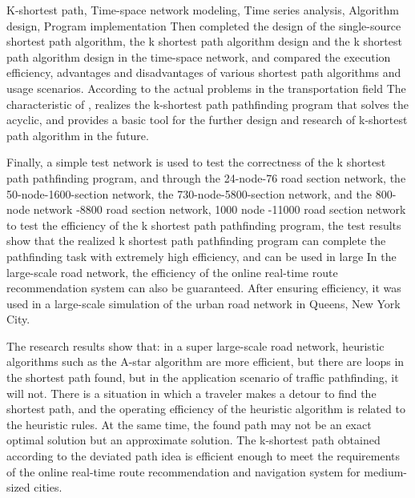 \begin{englishabstract}{K-shortest path, Time-space network modeling, Time series analysis, Algorithm design, Program implementation}
    Then completed the design of the single-source shortest path algorithm, the k shortest path algorithm design and the k shortest path algorithm design in the time-space network, and compared the execution efficiency, advantages and disadvantages of various shortest path algorithms and usage scenarios. According to the actual problems in the transportation field The characteristic of , realizes the k-shortest path pathfinding program that solves the acyclic, and provides a basic tool for the further design and research of k-shortest path algorithm in the future.

    Finally, a simple test network is used to test the correctness of the k shortest path pathfinding program, and through the 24-node-76 road section network, the 50-node-1600-section network, the 730-node-5800-section network, and the 800-node network -8800 road section network, 1000 node -11000 road section network to test the efficiency of the k shortest path pathfinding program, the test results show that the realized k shortest path pathfinding program can complete the pathfinding task with extremely high efficiency, and can be used in large In the large-scale road network, the efficiency of the online real-time route recommendation system can also be guaranteed. After ensuring efficiency, it was used in a large-scale simulation of the urban road network in Queens, New York City.

    The research results show that: in a super large-scale road network, heuristic algorithms such as the A-star algorithm are more efficient, but there are loops in the shortest path found, but in the application scenario of traffic pathfinding, it will not. There is a situation in which a traveler makes a detour to find the shortest path, and the operating efficiency of the heuristic algorithm is related to the heuristic rules. At the same time, the found path may not be an exact optimal solution but an approximate solution. The k-shortest path obtained according to the deviated path idea is efficient enough to meet the requirements of the online real-time route recommendation and navigation system for medium-sized cities.
\end{englishabstract}
